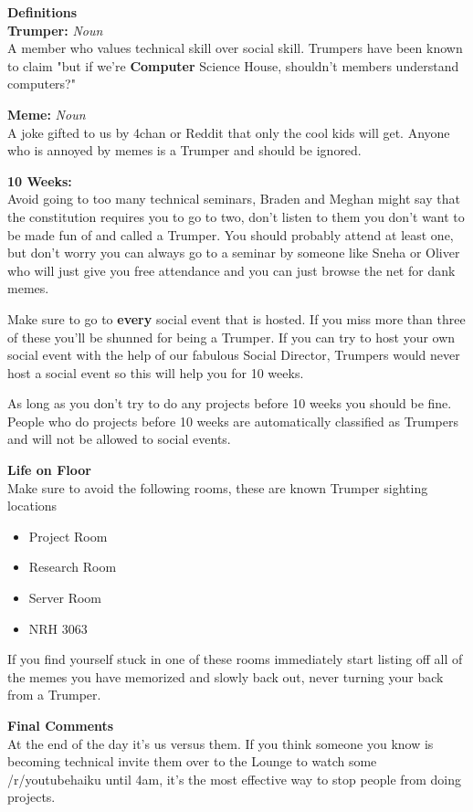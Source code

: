 \documentclass[9pt]{extarticle} %
\begin{document}
\begin{minipage}[t]{.61\linewidth} %
\vspace{-0.4cm}
\hypertarget{firstnews}{}
 
\textbf{Definitions} \\
\textbf{Trumper:} \textit{Noun} \\
A member who values technical skill over social skill. Trumpers have been
known to claim "but if we're \textbf{Computer} Science House, shouldn't members
understand computers?"

\textbf{Meme:} \textit{Noun} \\
A joke gifted to us by 4chan or Reddit that only the cool kids will get.
Anyone who is annoyed by memes is a Trumper and should be ignored.

\textbf{10 Weeks:} \\
Avoid going to too many technical seminars, Braden and Meghan might say that
the constitution requires you to go to two, don't listen to them you don't want
to be made fun of and called a Trumper. You should probably attend at least one,
but don't worry you can always go to a seminar by someone like Sneha or Oliver
who will just give you free attendance and you can just browse the net for dank
memes.

Make sure to go to \textbf{every} social event that is hosted. If you miss more than
three of these you'll be shunned for being a Trumper. If you can try to host
your own social event with the help of our fabulous Social Director, Trumpers
would never host a social event so this will help you for 10 weeks.

As long as you don't try to do any projects before 10 weeks you should be fine.
People who do projects before 10 weeks are automatically classified as Trumpers
and will not be allowed to social events.

\textbf{Life on Floor} \\
Make sure to avoid the following rooms, these are known Trumper sighting
locations
\begin{itemize}
\item Project Room 
\item Research Room
\item Server Room 
\item NRH 3063 
\end{itemize}
If you find yourself stuck in one of these rooms immediately start listing off
all of the memes you have memorized and slowly back out, never turning your back
from a Trumper.

\textbf{Final Comments} \\
At the end of the day it's us versus them. If you think someone you know is
becoming technical invite them over to the Lounge to watch some /r/youtubehaiku
until 4am, it's the most effective way to stop people from doing projects.



\end{minipage} %

\end{document}
